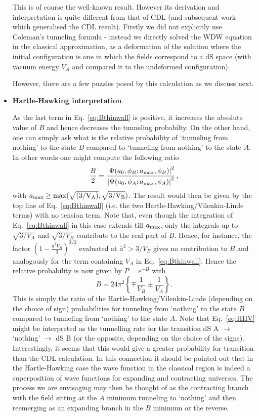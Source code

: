 \documentclass[a4paper,11pt]{article}
\numberwithin{equation}{section}
\begin{document}
\begin{itemize}
\begin{equation}
\end{equation}
This is of course the well-known result. However its derivation and
interpretation is quite different from that of CDL (and subsequent
work which generalised the CDL result). Firstly we did not explicitly
use Coleman's tunneling formula - instead we directly solved the WDW
equation in the classical approximation, as a deformation of the solution
where the initial configuration is one in which the fields correspond
to a dS space (with vacuum energy  $V_{A}$ and compared it to
the undeformed configuration).

However, there are a few puzzles posed by this calculation as we discuss next.
\item{\bf Hartle-Hawking interpretation}. 

As the
last term in Eq.~\eqref{eq:Bthinwall} is positive, it increases the absolute value of $B$ and
hence decreases the tunneling probabilty. On the other hand, one can simply ask what is the relative probability of ‘tunneling from nothing’ to the state $B$ compared to ‘tunneling from nothing’ to the state $A$. In other words one might compute the following ratio
\begin{equation}
\frac{B}{2} = \frac{\left|\Psi(a_0, \phi_B; a_{\rm max}, \phi_B)\right|^2}{\left|\Psi(a_0, \phi_A; a_{\rm max}, \phi_A)\right|^2} \,,
\end{equation}
with $a_{\rm max} \geq \rm{max}(\sqrt{(3/V_A)}, \sqrt{3/V_B})$. The result would then be given by the top line of Eq.~\eqref{eq:Bthinwall} (i.e. the two Hartle-Hawking/Vilenkin-Linde terms) with no tension term. Note that, even though the integration of Eq.~\eqref{eq:Bthinwall} in this case extends till $a_{\rm max}$, only the integrals up to $\sqrt{3/V_A}$ and $\sqrt{3/V_B}$ contribute to the real part of $B$. Hence, for instance, the factor $\left(1 - \frac{\bar{a}^2 V_B}{3}\right)^{3/2}$ evaluated at $\bar{a}^2 > 3/V_B$ gives no contribution to $B$ and analogously for the term containing $V_A$ in Eq.~\eqref{eq:Bthinwall}. Hence the relative
probability is now given by $P=e^{-B}$ with 
\begin{equation}
\boxed{\quad B=24\pi^{2}\left\{ \mp\frac{1}{V_{B}}\pm\frac{1}{V_{A}}\right\} .\quad }\label{eq:HHV}
\end{equation}
This is simply the ratio of the Hartle-Hawking/Vilenkin-Linde (depending on the choice of sign) probabilities for tunneling from ‘nothing’ to the state $B$ compared to tunneling from ‘nothing’ to the state $A$. Note that Eq.~\eqref{eq:HHV} might be interpreted as the tunnelling rate for the transition dS A $\rightarrow$ ‘nothing’ $\rightarrow$ dS B (or the opposite, depending on the choice of the signs). Interestingly, it seems that this would give a greater probability for transition than the CDL calculation. In this connection it should be pointed out that in the Hartle-Hawking case the wave function in the classical region is indeed a superposition of wave functions for expanding and contracting universes. The process we are envisaging may then be thought of as the contracting branch with the field sitting at the $A$ minimum tunneling to ‘nothing’ and then reemerging as an expanding branch in the $B$ minimum or the reverse.


\end{itemize}
\end{document}
